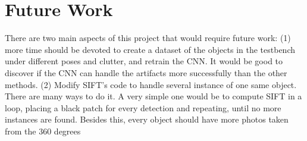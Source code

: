 \documentclass[../main.tex]{subfiles}
\begin{document}
\section{Future Work}
There are two main aspects of this project that would require future work: (1) more time should be devoted to create a dataset of the objects in the testbench under different poses and clutter, and retrain the CNN. It would be good to discover if the CNN can handle the artifacts more successfully than the other methods. (2) Modify SIFT's code to handle several instance of one same object. There are many ways to do it. A very simple one would be to compute SIFT in a loop, placing a black patch for every detection and repeating, until no more instances are found. Besides this, every object should have more photos taken from the 360 degrees
\end{document}
